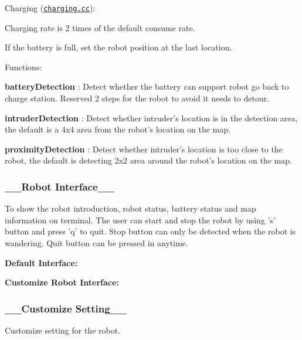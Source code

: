 \begin{DoxyItemize}
\begin{DoxyEnumerate}
\end{DoxyEnumerate}
\item Charging (\href{charging.cc}{\tt charging.\+cc})\+:
\begin{DoxyEnumerate}
\item Charging rate is 2 times of the default consume rate.
\item If the battery is full, set the robot position at the last location.
\end{DoxyEnumerate}
\end{DoxyItemize}

Functions\+:
\begin{DoxyItemize}
\item {\bfseries battery\+Detection} \+: Detect whether the battery can support robot go back to charge station. Reserved 2 steps for the robot to avoid it needs to detour.
\item {\bfseries intruder\+Detection} \+: Detect whether intruder's location is in the detection area, the default is a 4x4 area from the robot's location on the map.
\item {\bfseries proximity\+Detection} \+: Detect whether intruder's location is too close to the robot, the default is detecting 2x2 area around the robot's location on the map.
\end{DoxyItemize}

\subsubsection*{\+\_\+\+\_\+\+Robot Interface\+\_\+\+\_\+}

To show the robot introduction, robot status, battery status and map information on terminal. The user can start and stop the robot by using 's' button and press 'q' to quit. Stop button can only be detected when the robot is wandering. Quit button can be pressed in anytime.

{\bfseries Default Interface\+:} 

{\bfseries Customize Robot Interface\+:} 

\subsubsection*{\+\_\+\+\_\+\+Customize Setting\+\_\+\+\_\+}

Customize setting for the robot.

